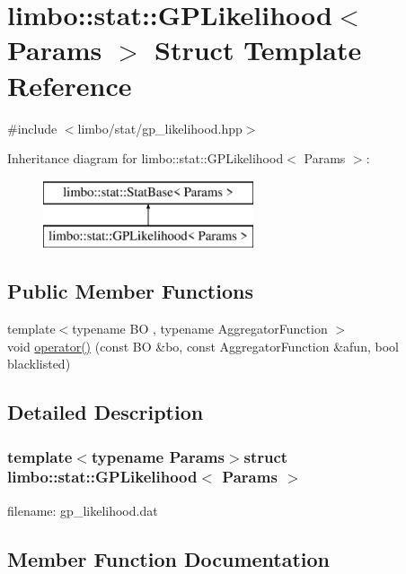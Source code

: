 \hypertarget{structlimbo_1_1stat_1_1_g_p_likelihood}{}\section{limbo\+:\+:stat\+:\+:G\+P\+Likelihood$<$ Params $>$ Struct Template Reference}
\label{structlimbo_1_1stat_1_1_g_p_likelihood}


{\ttfamily \#include $<$limbo/stat/gp\+\_\+likelihood.\+hpp$>$}

Inheritance diagram for limbo\+:\+:stat\+:\+:G\+P\+Likelihood$<$ Params $>$\+:\begin{figure}[H]
\begin{center}
\leavevmode
\includegraphics[height=2.000000cm]{structlimbo_1_1stat_1_1_g_p_likelihood}
\end{center}
\end{figure}
\subsection*{Public Member Functions}
\begin{DoxyCompactItemize}
\item 
{\footnotesize template$<$typename B\+O , typename Aggregator\+Function $>$ }\\void \hyperlink{structlimbo_1_1stat_1_1_g_p_likelihood_a8c78ab1bd939bba755fd4b4c9a7a5113}{operator()} (const B\+O \&bo, const Aggregator\+Function \&afun, bool blacklisted)
\end{DoxyCompactItemize}


\subsection{Detailed Description}
\subsubsection*{template$<$typename Params$>$struct limbo\+::stat\+::\+G\+P\+Likelihood$<$ Params $>$}

filename\+: {\ttfamily gp\+\_\+likelihood.\+dat} 

\subsection{Member Function Documentation}
\hypertarget{structlimbo_1_1stat_1_1_g_p_likelihood_a8c78ab1bd939bba755fd4b4c9a7a5113}{}
